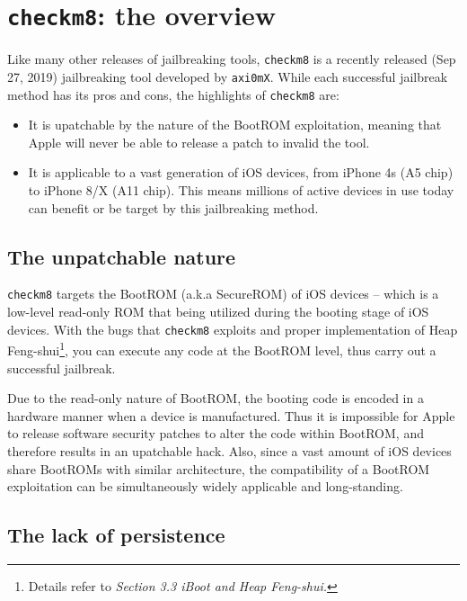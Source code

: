 \documentclass[10pt]{article}
\newcommand{\inlinecode}{\texttt}
\begin{document}
\section{\inlinecode{checkm8}: the overview}

Like many other releases of jailbreaking tools, \inlinecode{checkm8} is a recently released (Sep 27, 2019) jailbreaking tool developed by \inlinecode{axi0mX}. While each successful jailbreak method has its pros and cons, the highlights of \inlinecode{checkm8} are:
\begin{itemize}
    \item It is upatchable by the nature of the BootROM exploitation, meaning that Apple will never be able to release a patch to invalid the tool.
    \item It is applicable to a vast generation of iOS devices, from iPhone 4s (A5 chip) to iPhone 8/X (A11 chip). This means millions of active devices in use today can benefit or be target by this jailbreaking method.
\end{itemize}

\subsection{The unpatchable nature}

\inlinecode{checkm8} targets the BootROM (a.k.a SecureROM) of iOS devices -- which is a low-level read-only ROM that being utilized during the booting stage of iOS devices. With the bugs that \inlinecode{checkm8} exploits and proper implementation of Heap Feng-shui\footnote{Details refer to \textit{Section 3.3 iBoot and Heap Feng-shui.}}, you can execute any code at the BootROM level, thus carry out a successful jailbreak.

Due to the read-only nature of BootROM, the booting code is encoded in a hardware manner when a device is manufactured. Thus it is impossible for Apple to release software security patches to alter the code within BootROM, and therefore results in an upatchable hack. Also, since a vast amount of iOS devices share BootROMs with similar architecture, the compatibility of a BootROM exploitation can be simultaneously widely applicable and long-standing.

\subsection{The lack of persistence}
\end{document}
